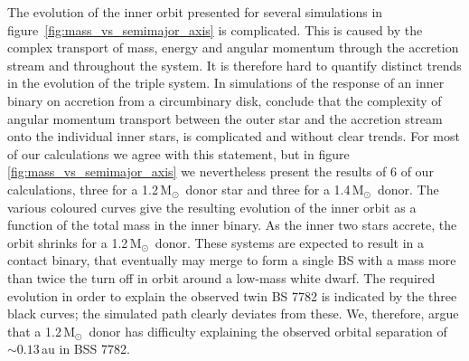 \documentclass[twocolumn]{aastex62}
\newcommand{\MSun}{\mbox{M$_\odot$}}
\begin{document}
The evolution of the inner orbit presented for several simulations in
figure~\ref{fig:mass_vs_semimajor_axis} is complicated.  This is
caused by the complex transport of mass, energy and angular momentum
through the accretion stream and throughout the system.  It is
therefore hard to quantify distinct trends in the evolution of the
triple system. In simulations of the response of an inner binary on
accretion from a circumbinary disk, \cite{2018arXiv181208175M}
conclude that the complexity of angular momentum transport between the
outer star and the accretion stream onto the individual inner stars,
is complicated and without clear trends. For most of our calculations
we agree with this statement, but in
figure~\,\ref{fig:mass_vs_semimajor_axis} we nevertheless present the
results of 6 of our calculations, three for a 1.2\,\MSun\, donor star
and three for a 1.4\,\MSun\, donor. The various coloured curves give
the resulting evolution of the inner orbit as a function of the total
mass in the inner binary. As the inner two stars accrete, the orbit
shrinks for a 1.2\,\MSun\, donor. These systems are expected to result
in a contact binary, that eventually may merge to form a single BS
with a mass more than twice the turn off in orbit around a low-mass
white dwarf. The required evolution in order to explain the observed
twin BS 7782 is indicated by the three black curves; the simulated
path clearly deviates from these. We, therefore, argue that a
1.2\,\MSun\, donor has difficulty explaining the observed orbital
separation of $\sim 0.13$\,au in BSS 7782.
\end{document}
